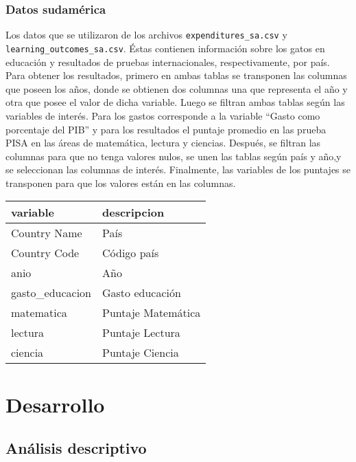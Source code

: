 \documentclass[
]{article}
\begin{document}
\hypertarget{datos-sudamuxe9rica}{%
\subsubsection{Datos sudamérica}\label{datos-sudamuxe9rica}}

Los datos que se utilizaron de los archivos
\texttt{expenditures\_sa.csv} y \texttt{learning\_outcomes\_sa.csv}.
Éstas contienen información sobre los gatos en educación y resultados de
pruebas internacionales, respectivamente, por país. Para obtener los
resultados, primero en ambas tablas se transponen las columnas que
poseen los años, donde se obtienen dos columnas una que representa el
año y otra que posee el valor de dicha variable. Luego se filtran ambas
tablas según las variables de interés. Para los gastos corresponde a la
variable ``Gasto como porcentaje del PIB'' y para los resultados el
puntaje promedio en las prueba PISA en las áreas de matemática, lectura
y ciencias. Después, se filtran las columnas para que no tenga valores
nulos, se unen las tablas según país y año,y se seleccionan las columnas
de interés. Finalmente, las variables de los puntajes se transponen para
que los valores están en las columnas.

\captionsetup[table]{labelformat=empty,skip=1pt}
\begin{longtable}{ll}
\toprule
variable & descripcion \\ 
\midrule
Country Name & País \\ 
Country Code & Código país \\ 
anio & Año \\ 
gasto\_educacion & Gasto educación \\ 
matematica & Puntaje Matemática \\ 
lectura & Puntaje Lectura \\ 
ciencia & Puntaje Ciencia \\ 
 \bottomrule
\end{longtable}

\hypertarget{desarrollo}{%
\section{Desarrollo}\label{desarrollo}}

\hypertarget{anuxe1lisis-descriptivo}{%
\subsection{Análisis descriptivo}\label{anuxe1lisis-descriptivo}}
\end{document}
